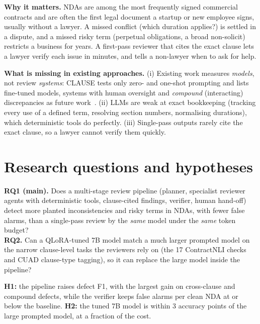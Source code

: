 \documentclass[11pt,a4paper]{article}
\begin{document}
\textbf{Why it matters.} NDAs are among the most frequently signed commercial contracts and are often the first legal document a startup or new employee signs, usually without a lawyer. A missed conflict (which duration applies?) is settled in a dispute, and a missed risky term (perpetual obligations, a broad non-solicit) restricts a business for years. A first-pass reviewer that cites the exact clause lets a lawyer verify each issue in minutes, and tells a non-lawyer when to ask for help.

\textbf{What is missing in existing approaches.}
(i) Existing work measures \emph{models}, not review \emph{systems}: CLAUSE tests only zero- and one-shot prompting
and lists fine-tuned models, systems with human oversight and \emph{compound} (interacting) discrepancies as future
work~\cite{clause}. (ii) LLMs are weak at exact bookkeeping (tracking every use of a defined term, resolving section
numbers, normalising durations), which deterministic tools do perfectly. (iii) Single-pass outputs rarely cite the
exact clause, so a lawyer cannot verify them quickly.

\section{Research questions and hypotheses}
\begin{keybox}
\textbf{RQ1 (main).} Does a multi-stage review pipeline (planner, specialist reviewer agents with deterministic tools,
clause-cited findings, verifier, human hand-off) detect more planted inconsistencies and risky terms in NDAs,
with fewer false alarms, than a single-pass review by the \emph{same} model under the \emph{same} token budget?\\[2pt]
\textbf{RQ2.} Can a QLoRA-tuned 7B model match a much larger prompted model on the narrow clause-level tasks the reviewers
rely on (the 17 ContractNLI checks and CUAD clause-type tagging), so it can replace the large model inside the pipeline?
\end{keybox}
\textbf{H1:} the pipeline raises defect F1, with the largest gain on cross-clause and compound defects, while the verifier
keeps false alarms per clean NDA at or below the baseline.
\textbf{H2:} the tuned 7B model is within 3 accuracy points of the large prompted model, at a fraction of the cost.

\end{document}
